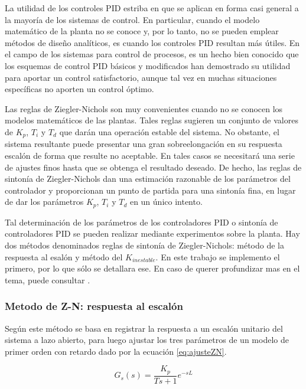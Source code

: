 \documentclass[10pt,conference,a4paper,onecolumn]{article}%
\begin{document}
La utilidad de los controles PID estriba en que se aplican en forma casi general a la mayoría de los sistemas de control. En particular, cuando el modelo matemático de la planta no se conoce y, por lo tanto, no se pueden emplear métodos de diseño analíticos, es cuando los controles PID resultan más útiles. En el campo de los sistemas para control de procesos, es un hecho bien conocido que los esquemas de control PID básicos y modificados han demostrado su utilidad para aportar un control satisfactorio, aunque tal vez en muchas situaciones específicas no aporten un control óptimo.

Las reglas de Ziegler-Nichols son muy convenientes cuando no se conocen los modelos matemáticos de las plantas. Tales reglas sugieren un conjunto de valores de $K_p$, $T_i$ y $T_d$ que darán una operación estable del sistema. No obstante, el sistema resultante puede presentar una gran sobreelongación en su respuesta escalón de forma que resulte no aceptable. En tales casos se necesitará una serie de ajustes finos hasta que se obtenga el resultado deseado. De hecho, las reglas de sintonía de Ziegler-Nichols dan una estimación razonable de los parámetros del controlador y proporcionan un punto de partida para una sintonía fina, en lugar de dar los parámetros $K_p$, $T_i$ y $T_d$ en un único intento.

Tal determinación de los parámetros de los controladores PID o sintonía de controladores PID se pueden realizar mediante experimentos sobre la planta. Hay dos métodos denominados reglas de sintonía de Ziegler-Nichols: método de la respuesta al esalón y método del $K_{inestable}$. En este trabajo se implemento el primero, por lo que sólo se detallara ese. En caso de querer profundizar mas en el tema, puede consultar \cite{biblia_PID} \cite{paginaPID}. 

\subsubsection{Metodo de Z-N: respuesta al escalón}

Según \cite{biblia_PID} este método se basa en registrar la respuesta a un escalón
unitario del sistema a lazo abierto, para luego ajustar los tres parámetros de un modelo
de primer orden con retardo dado por la ecuación \ref{eq:ajusteZN}.

\begin{equation}
G_s(s)=\frac{K_p}{Ts+1}e^{-sL}
\label{eq:ajusteZN}
\end{equation}
\end{document}
